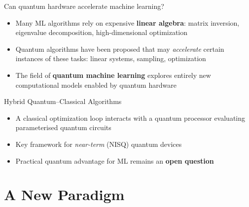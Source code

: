 \documentclass[aspectratio=169]{beamer}
\begin{document}
\begin{frame}{Can quantum hardware accelerate machine learning?}

  \begin{itemize}
    \item Many ML algorithms rely on expensive \textbf{linear algebra}:
          matrix inversion, eigenvalue decomposition, high-dimensional
          optimization
    \medskip
    \item Quantum algorithms have been proposed that may \emph{accelerate}
          certain instances of these tasks: linear systems, sampling,
          optimization
    \medskip
    \item The field of \textbf{quantum machine learning} explores entirely
          new computational models enabled by quantum hardware
  \end{itemize}

  \medskip
  \begin{block}{Hybrid Quantum--Classical Algorithms}
    \begin{itemize}
      \item A classical optimization loop interacts with a quantum
            processor evaluating parameterised quantum circuits
      \item Key framework for \emph{near-term} (NISQ) quantum devices
      \item Practical quantum advantage for ML remains an \textbf{open question}
    \end{itemize}
  \end{block}

\end{frame}

\section{A New Paradigm}
\end{document}
